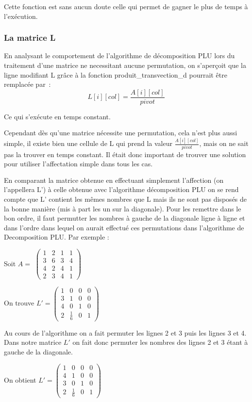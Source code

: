 \documentclass[11pt]{article}
\begin{document}
Cette fonction est sans aucun doute celle qui permet de gagner le plus de temps à l'exécution.

\subsubsection{La matrice L}

En analysant le comportement de l'algorithme de décomposition PLU lors du traitement d'une matrice ne necessitant aucune permutation, on s'aperçoit que la ligne modifiant L grâce à la fonction produit\_transvection\_d pourrait être remplacée par :\[L[i][col] = \frac{A[i][col]}{pivot}\]

Ce qui s'exécute en temps constant.

Cependant dès qu'une matrice nécessite une permutation, cela n'est plus aussi simple, il existe bien une cellule de L qui prend la valeur $ \frac{A[i][col]}{pivot}$, mais on ne sait pas la trouver en temps constant. Il était donc important de trouver une solution pour utiliser l'affectation simple dans tous les cas.

En comparant la matrice obtenue en effectuant simplement l'affection (on l'appellera L') à celle obtenue avec l'algorithme décomposition PLU on se rend compte que L' contient les mêmes nombres que L mais ils ne sont pas disposés de la bonne manière (mis à part les un sur la diagonale). Pour les remettre dans le bon ordre, il faut permutter les nombres à gauche de la diagonale ligne à ligne et dans l'ordre dans lequel on aurait effectué ces permutations dans l'algorithme de Decomposition PLU. Par exemple :

Soit $ A = $
$\begin{pmatrix}
1&2&1&1\\
3&6&3&4\\
4&2&4&1\\
2&3&4&1
\end{pmatrix}$

On trouve $L' = 
\begin{pmatrix}
1&0&0&0\\
3&1&0&0\\
4&0&1&0\\
2&\frac{1}{6}&0&1
\end{pmatrix}$

Au cours de l'algorithme on a fait permuter les lignes 2 et 3 puis les lignes 3 et 4. Dans notre matrice $L'$ on fait donc permuter les nombres des lignes 2 et 3 étant à gauche de la diagonale.

On obtient $L' = 
\begin{pmatrix}
1&0&0&0\\
4&1&0&0\\
3&0&1&0\\
2&\frac{1}{6}&0&1
\end{pmatrix}$
\end{document}

